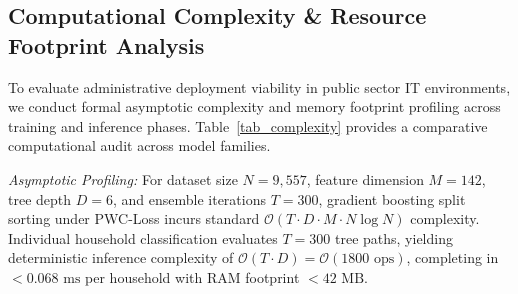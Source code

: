 \documentclass[conference]{IEEEtran}
\begin{document}
\subsection{Computational Complexity & Resource Footprint Analysis}
To evaluate administrative deployment viability in public sector IT environments, we conduct formal asymptotic complexity and memory footprint profiling across training and inference phases. Table~\ref{tab_complexity} provides a comparative computational audit across model families.

\begin{table}[htbp]
\caption{Computational Resource & Execution Profiling Across Model Families}
\begin{center}
\label{tab_complexity}
\end{center}
\end{table}

\textit{Asymptotic Profiling:} For dataset size $N=9,557$, feature dimension $M=142$, tree depth $D=6$, and ensemble iterations $T=300$, gradient boosting split sorting under PWC-Loss incurs standard $\mathcal{O}(T \cdot D \cdot M \cdot N \log N)$ complexity. Individual household classification evaluates $T=300$ tree paths, yielding deterministic inference complexity of $\mathcal{O}(T \cdot D) = \mathcal{O}(1800 \text{ ops})$, completing in $<0.068\text{ ms}$ per household with RAM footprint $<42\text{ MB}$.
\end{document}
